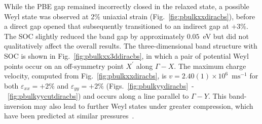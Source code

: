 While the PBE gap remained 
incorrectly closed in the relaxed state, 
a possible Weyl {state} was observed 
at 2\% uniaxial strain 
(Fig.~\ref{fig:pbulkxxdiracbs}), 
before a direct gap opened 
that subsequently transitioned to an 
indirect gap at $+3\%$.
%
The SOC slightly 
reduced the band gap by approximately $0.05$~eV 
but did not qualitatively 
affect the overall results.
%
The three-dimensional band structure with SOC 
is shown in Fig.~\ref{fig:pbulkxx3ddiracbs}, 
in which a pair of potential Weyl points occur  
on an off-symmetry point $X^\prime$ 
along $\Gamma-X$.
%
{
The maximum charge velocity, 
computed from Fig.~\ref{fig:pbulkxxdiracbs},
is $v=2.40(1)\times 10^6$~$\textrm{ms}^{-1}$  
for both $\varepsilon_{xx}=+2\%$
and  $\varepsilon_{yy}=+2\%$ 
(Figs.~\ref{fig:pbulkyydiracbs}~-~\ref{fig:pbulkyycutdiracbs})
and occurs along a line parallel to $\Gamma-Y$.}
%
This band-inversion may 
also lead to further Weyl {states}
under greater compression,    
which have been predicted 
at similar pressures~\cite{PhysRevLett.115.186403,PhysRevB.93.195434,PhysRevB.91.195319}.

